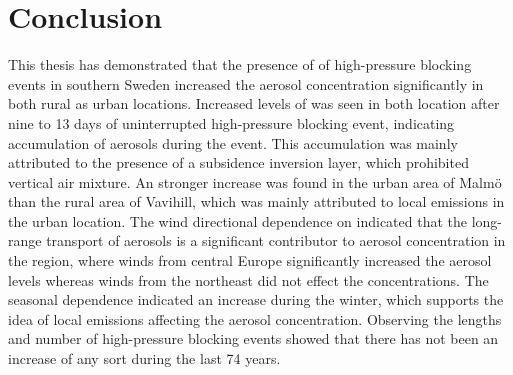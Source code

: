 \section{Conclusion}
This thesis has demonstrated that the presence of of high-pressure blocking events in southern Sweden increased the aerosol concentration significantly in both rural as urban locations. Increased levels of \PM was seen in both location after nine to 13 days of uninterrupted high-pressure blocking event, indicating accumulation of aerosols during the event. This accumulation was mainly attributed to the presence of a subsidence inversion layer, which prohibited vertical air mixture. An stronger increase was found in the urban area of Malmö than the rural area of Vavihill, which was mainly attributed to local emissions in the urban location. The wind directional dependence on \PM indicated that the long-range transport of aerosols is a significant contributor to aerosol concentration in the region, where winds from central Europe significantly increased the aerosol levels whereas winds from the northeast did not effect the concentrations. The seasonal dependence indicated an increase during the winter, which supports the idea of local emissions affecting the aerosol concentration. Observing the lengths and number of high-pressure blocking events showed that there has not been an increase of any sort during the last 74 years. 
